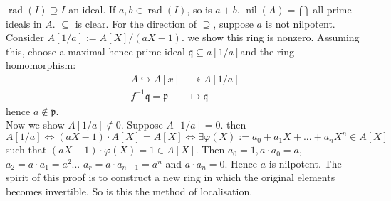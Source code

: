 \documentclass[12pt]{article}
\theoremstyle{definition}
\theoremstyle{plain}
\DeclareMathOperator{\nil}{nil}
\DeclareMathOperator{\rad}{rad}
\begin{document}
\Rmk $\rad(I)\supseteq I$ an ideal. If $a, b\in \rad(I)$, so is $a+b$.
\Prop $\nil(A)=\bigcap$ all prime ideals in $A$.
\proof $\subseteq$ is clear. For the direction of $\supseteq$, suppose $a$ is not nilpotent. Consider $A[1/a]:=A[X]/(aX-1)$. we show this ring is nonzero. Assuming this, choose a maximal hence prime ideal $\mathfrak{q}\subseteq a[1/a]$and the ring homomorphism:\begin{align}
  A\hookrightarrow A[x]&\twoheadrightarrow A[1/a]\\
  f^{-1}\mathfrak{q}=\mathfrak{p} &\mapsto \mathfrak{q}
\end{align}
hence $a\notin \mathfrak{p}$. \\
Now we show $A[1/a]\notin 0$. Suppose $A[1/a]=0$. then $A[1/a]\iff (aX-1)\cdot A[X]=A[X]\iff \exists \varphi(X):=a_0+a_1X+...+a_nX^n\in A[X]$ such that $(aX-1)\cdot \varphi(X)=1\in A[X]$. Then $a_0=1, a\cdot a_0=a$, $a_2=a\cdot a_1=a^2$... $a_r=a\cdot a_{n-1}=a^n$ and $a\cdot a_n=0$. Hence $a$ is nilpotent.
\Rmk The spirit of this proof is to construct a new ring in which the original elements becomes invertible. So is this the method of localisation.

\bigskip
\end{document}
